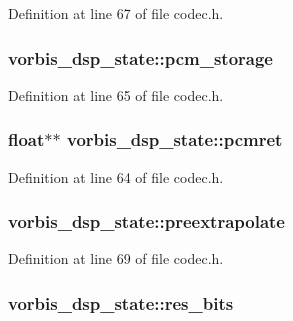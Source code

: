 Definition at line 67 of file codec.\+h.

\subsubsection[{\texorpdfstring{pcm\+\_\+storage}{pcm_storage}}]{ vorbis\+\_\+dsp\+\_\+state\+::pcm\+\_\+storage}\hypertarget{structvorbis__dsp__state_a33cf1637859094c31429dace6dfc79e2}{}\label{structvorbis__dsp__state_a33cf1637859094c31429dace6dfc79e2}


Definition at line 65 of file codec.\+h.

\subsubsection[{\texorpdfstring{pcmret}{pcmret}}]{\setlength{\rightskip}{0pt plus 5cm}float$\ast$$\ast$ vorbis\+\_\+dsp\+\_\+state\+::pcmret}\hypertarget{structvorbis__dsp__state_ab2c2a87593f0d7a3c867ba80102c4260}{}\label{structvorbis__dsp__state_ab2c2a87593f0d7a3c867ba80102c4260}


Definition at line 64 of file codec.\+h.

\subsubsection[{\texorpdfstring{preextrapolate}{preextrapolate}}]{ vorbis\+\_\+dsp\+\_\+state\+::preextrapolate}\hypertarget{structvorbis__dsp__state_aecc3c42d23d876c8bfd396b5c2ac5eb6}{}\label{structvorbis__dsp__state_aecc3c42d23d876c8bfd396b5c2ac5eb6}


Definition at line 69 of file codec.\+h.

\subsubsection[{\texorpdfstring{res\+\_\+bits}{res_bits}}]{ vorbis\+\_\+dsp\+\_\+state\+::res\+\_\+bits}\hypertarget{structvorbis__dsp__state_a3091c7fac6b57c54027c32931a7e6ee0}{}\label{structvorbis__dsp__state_a3091c7fac6b57c54027c32931a7e6ee0}


